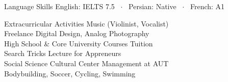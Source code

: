 \documentclass{resume} %
\begin{document}
\begin{rSection}{Language Skills}
  English: IELTS 7.5 ~$\cdot$~ Persian: Native ~$\cdot$~ French: A1
\end{rSection}

\begin{rSection}{Extracurricular Activities}
  Music (Violinist, Vocalist) \\
  Freelance Digital Design, Analog Photography \\
  High School \& Core University Courses Tuition \\
  Search Tricks Lecture for Appreneurs \\
  Social Science Cultural Center Management at AUT \\
  Bodybuilding, Soccer, Cycling, Swimming  %
\end{rSection}
\end{document}
